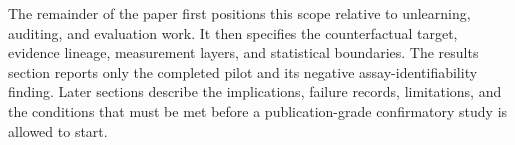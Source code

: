 The remainder of the paper first positions this scope relative to unlearning, auditing, and
evaluation work. It then specifies the counterfactual target, evidence lineage, measurement
layers, and statistical boundaries. The results section reports only the completed pilot and
its negative assay-identifiability finding. Later sections describe the implications, failure
records, limitations, and the conditions that must be met before a publication-grade
confirmatory study is allowed to start.
